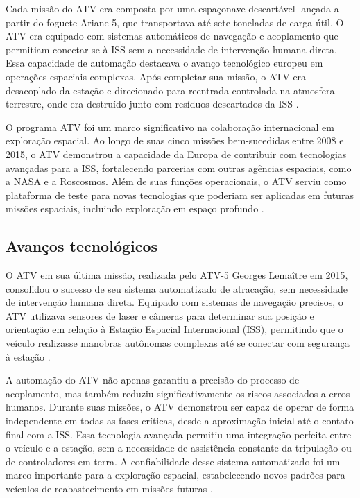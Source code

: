 Cada missão do ATV era composta por uma espaçonave descartável lançada a partir do foguete Ariane 5, que transportava até sete toneladas de carga útil. O ATV era equipado com sistemas automáticos de navegação e acoplamento que permitiam conectar-se à ISS sem a necessidade de intervenção humana direta. Essa capacidade de automação destacava o avanço tecnológico europeu em operações espaciais complexas. Após completar sua missão, o ATV era desacoplado da estação e direcionado para reentrada controlada na atmosfera terrestre, onde era destruído junto com resíduos descartados da ISS \cite{esaATV}.

O programa ATV foi um marco significativo na colaboração internacional em exploração espacial. Ao longo de suas cinco missões bem-sucedidas entre 2008 e 2015, o ATV demonstrou a capacidade da Europa de contribuir com tecnologias avançadas para a ISS, fortalecendo parcerias com outras agências espaciais, como a NASA e a Roscosmos. Além de suas funções operacionais, o ATV serviu como plataforma de teste para novas tecnologias que poderiam ser aplicadas em futuras missões espaciais, incluindo exploração em espaço profundo \cite{esaATV}.

\subsection{Avanços tecnológicos}

O ATV em sua última missão, realizada pelo ATV-5 Georges Lemaître em 2015, consolidou o sucesso de seu sistema automatizado de atracação, sem necessidade de intervenção humana direta. Equipado com sistemas de navegação precisos, o ATV utilizava sensores de laser e câmeras para determinar sua posição e orientação em relação à Estação Espacial Internacional (ISS), permitindo que o veículo realizasse manobras autônomas complexas até se conectar com segurança à estação \cite{esaATVFinal}.

A automação do ATV não apenas garantiu a precisão do processo de acoplamento, mas também reduziu significativamente os riscos associados a erros humanos. Durante suas missões, o ATV demonstrou ser capaz de operar de forma independente em todas as fases críticas, desde a aproximação inicial até o contato final com a ISS. Essa tecnologia avançada permitiu uma integração perfeita entre o veículo e a estação, sem a necessidade de assistência constante da tripulação ou de controladores em terra. A confiabilidade desse sistema automatizado foi um marco importante para a exploração espacial, estabelecendo novos padrões para veículos de reabastecimento em missões futuras \cite{esaATVFinal}.

